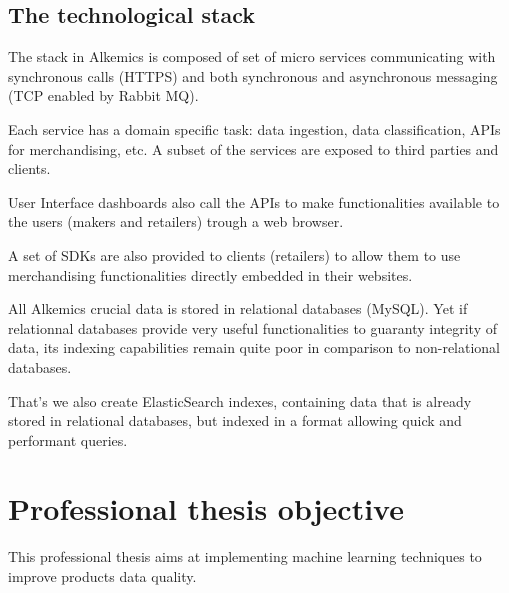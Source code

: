 \subsection{The technological stack}

The stack in Alkemics is composed of set of micro services communicating with synchronous calls (HTTPS) and both synchronous and asynchronous messaging (TCP enabled by Rabbit MQ).

Each service has a domain specific task: data ingestion, data classification, APIs for merchandising, etc. A subset of the services  are exposed to third parties and clients.

User Interface dashboards also call the APIs to make functionalities available to the users (makers and retailers) trough a web browser.

A set of SDKs are also provided to clients (retailers) to allow them to use merchandising functionalities directly embedded in their websites.


All Alkemics crucial data is stored in relational databases (MySQL). Yet if relationnal databases provide very useful functionalities to guaranty integrity of data, its indexing capabilities remain quite poor in comparison to non-relational databases.

That's we also create ElasticSearch indexes, containing data that is already stored in relational databases, but indexed in a format allowing quick and performant queries.


\section{Professional thesis objective}

This professional thesis aims at implementing machine learning techniques to improve products data quality.
